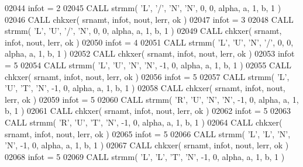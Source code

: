 \begin{DoxyCode}
02044       infot = 2
02045       \textcolor{keyword}{CALL }strmm( \textcolor{stringliteral}{'L'}, \textcolor{stringliteral}{'/'}, \textcolor{stringliteral}{'N'}, \textcolor{stringliteral}{'N'}, 0, 0, alpha, a, 1, b, 1 )
02046       \textcolor{keyword}{CALL }chkxer( srnamt, infot, nout, lerr, ok )
02047       infot = 3
02048       \textcolor{keyword}{CALL }strmm( \textcolor{stringliteral}{'L'}, \textcolor{stringliteral}{'U'}, \textcolor{stringliteral}{'/'}, \textcolor{stringliteral}{'N'}, 0, 0, alpha, a, 1, b, 1 )
02049       \textcolor{keyword}{CALL }chkxer( srnamt, infot, nout, lerr, ok )
02050       infot = 4
02051       \textcolor{keyword}{CALL }strmm( \textcolor{stringliteral}{'L'}, \textcolor{stringliteral}{'U'}, \textcolor{stringliteral}{'N'}, \textcolor{stringliteral}{'/'}, 0, 0, alpha, a, 1, b, 1 )
02052       \textcolor{keyword}{CALL }chkxer( srnamt, infot, nout, lerr, ok )
02053       infot = 5
02054       \textcolor{keyword}{CALL }strmm( \textcolor{stringliteral}{'L'}, \textcolor{stringliteral}{'U'}, \textcolor{stringliteral}{'N'}, \textcolor{stringliteral}{'N'}, -1, 0, alpha, a, 1, b, 1 )
02055       \textcolor{keyword}{CALL }chkxer( srnamt, infot, nout, lerr, ok )
02056       infot = 5
02057       \textcolor{keyword}{CALL }strmm( \textcolor{stringliteral}{'L'}, \textcolor{stringliteral}{'U'}, \textcolor{stringliteral}{'T'}, \textcolor{stringliteral}{'N'}, -1, 0, alpha, a, 1, b, 1 )
02058       \textcolor{keyword}{CALL }chkxer( srnamt, infot, nout, lerr, ok )
02059       infot = 5
02060       \textcolor{keyword}{CALL }strmm( \textcolor{stringliteral}{'R'}, \textcolor{stringliteral}{'U'}, \textcolor{stringliteral}{'N'}, \textcolor{stringliteral}{'N'}, -1, 0, alpha, a, 1, b, 1 )
02061       \textcolor{keyword}{CALL }chkxer( srnamt, infot, nout, lerr, ok )
02062       infot = 5
02063       \textcolor{keyword}{CALL }strmm( \textcolor{stringliteral}{'R'}, \textcolor{stringliteral}{'U'}, \textcolor{stringliteral}{'T'}, \textcolor{stringliteral}{'N'}, -1, 0, alpha, a, 1, b, 1 )
02064       \textcolor{keyword}{CALL }chkxer( srnamt, infot, nout, lerr, ok )
02065       infot = 5
02066       \textcolor{keyword}{CALL }strmm( \textcolor{stringliteral}{'L'}, \textcolor{stringliteral}{'L'}, \textcolor{stringliteral}{'N'}, \textcolor{stringliteral}{'N'}, -1, 0, alpha, a, 1, b, 1 )
02067       \textcolor{keyword}{CALL }chkxer( srnamt, infot, nout, lerr, ok )
02068       infot = 5
02069       \textcolor{keyword}{CALL }strmm( \textcolor{stringliteral}{'L'}, \textcolor{stringliteral}{'L'}, \textcolor{stringliteral}{'T'}, \textcolor{stringliteral}{'N'}, -1, 0, alpha, a, 1, b, 1 )

\end{DoxyCode}
